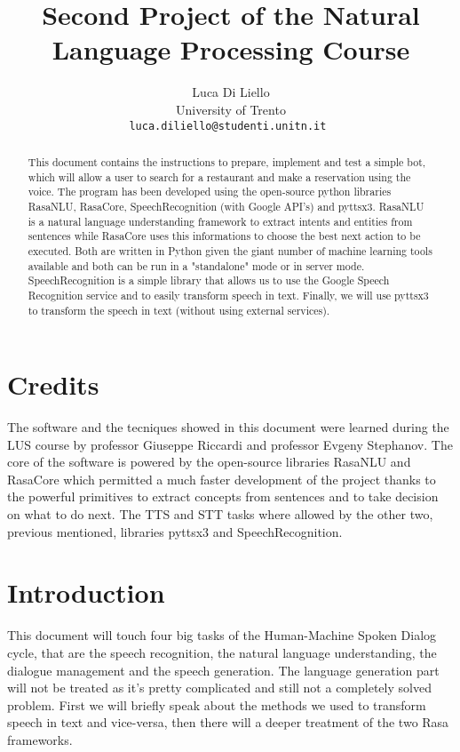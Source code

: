 \documentclass[11pt,a4paper]{article}
\title{Second Project of the Natural Language Processing Course}
\author{Luca Di Liello \\
	University of Trento\\
	{\tt luca.diliello@studenti.unitn.it }
}
\begin{document}
\maketitle

\begin{abstract}

This document contains the instructions to prepare, implement and test a simple bot, which will allow a user to search for a restaurant and make a reservation using the voice. The program has been developed using the open-source python libraries RasaNLU, RasaCore, SpeechRecognition (with Google API's) and pyttsx3. RasaNLU is a natural language understanding framework to extract intents and entities from sentences while RasaCore uses this informations to choose the best next action to be executed. Both are written in Python given the giant number of machine learning tools available and both can be run in a "standalone" mode or in server mode. SpeechRecognition is a simple library that allows us to use the Google Speech Recognition service and to easily transform speech in text. Finally, we will use pyttsx3 to transform the speech in text (without using external services).
\end{abstract}

\section{Credits}

The software and the tecniques showed in this document were learned during the LUS course by professor Giuseppe Riccardi and professor Evgeny Stephanov. The core of the software is powered by the open-source libraries RasaNLU and RasaCore which permitted a much faster development of the project thanks to the powerful primitives to extract concepts from sentences and to take decision on what to do next. The TTS and STT tasks where allowed by the other two, previous mentioned, libraries pyttsx3 and SpeechRecognition.

\section{Introduction}

This document will touch four big tasks of the Human-Machine Spoken Dialog cycle, that are the speech recognition, the natural language understanding, the dialogue management and the speech generation. The language generation part will not be treated as it's pretty complicated and still not a completely solved problem. First we will briefly speak about the methods we used to transform speech in text and vice-versa, then there will a deeper treatment of the two Rasa frameworks.
\end{document}
